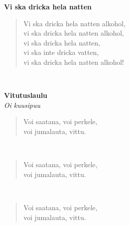 \noindent\begin{minipage}{\linewidth}
\vspace{5pt}
\parbox[t]{0.85\linewidth}{\raggedright {\large\bf Vi ska dricka hela natten}\\[6pt]}
\begin{verse}
	Vi ska dricka hela natten alkohol,\\
	vi ska dricka hela natten alkohol,\\
	vi ska dricka hela natten,\\
	vi ska inte dricka vatten,\\
	vi ska dricka hela natten alkohol!\\
\end{verse}
\end{minipage}\\[10pt]
%
%
\noindent\begin{minipage}{\linewidth}
\vspace{5pt}
\parbox[t]{0.85\linewidth}{\raggedright {\large\bf Vitutuslaulu}\\[2pt]\small\emph{Oi kuusipuu}\\[6pt]}
\begin{verse}
	
	Voi saatana, voi perkele,\\
	voi jumalauta, vittu.\\
\end{verse}
\end{minipage}\\[10pt]
\noindent\begin{minipage}{\linewidth}
\begin{verse}
	Voi saatana, voi perkele,\\
	voi jumalauta, vittu.\\
\end{verse}
\end{minipage}\\[10pt]
\noindent\begin{minipage}{\linewidth}
\begin{verse}
	Voi saatana, voi perkele,\\
	voi jumalauta, vittu.\\
\end{verse}
\end{minipage}\\[10pt]
